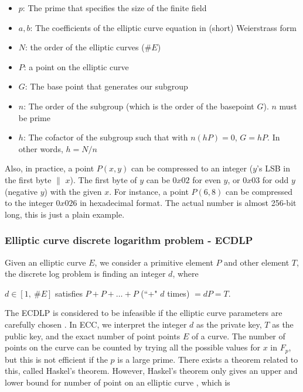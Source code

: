 \begin{itemize}
  \item$p$: The prime that specifies the size of the finite field
  \item$a, b$: The coefficients of the elliptic curve equation in (short) Weierstrass form
  \item$N$: the order of the elliptic curves ($\#E$)
  \item $P$: a point on the elliptic curve
        \item$G$: The base point that generates our subgroup
        \item$n$: The order of the subgroup (which is the order of the basepoint $G$). $n$ must be prime
        \item$h$: The cofactor of the subgroup such that with $n(hP)=0$, $G = hP$. In other words, $h=N/n$
\end{itemize}

Also, in practice, a point $P(x,y)$ can be compressed to an integer ($y$’s LSB in the first byte $\|$  $x$). The first byte of $y$ can be $0x02$ for even $y$, or $0x03$ for odd $y$ (negative $y$) with the given $x$. For instance, a point $P(6, 8)$ can be compressed to the integer $0x026$ in hexadecimal format. The actual number is almost 256-bit long, this is just a plain example.

\subsubsection{Elliptic curve discrete logarithm problem - ECDLP}

Given an elliptic curve $E$, we consider a primitive element $P$ and other element $T$, the discrete log problem is finding an integer $d$, where
\begin{center}

$d \in [1, \ \#E]$ satisfies $P + P + \dotso + P$ (``+" $d$ times) $= dP = T$.
\end{center}

The ECDLP is considered to be infeasible if the elliptic curve parameters are carefully chosen \cite{DBLP:journals/iacr/BosCLN14}. In ECC, we interpret the integer $d$ as the private key, $T$ as the public key, and the exact number of point points $E$ of a curve. The number of points on the curve can be counted by trying all the possible values for $x$ in $F_p$, but this is not efficient if the $p$ is a large prime. There exists a theorem related to this, called Haskel’s theorem. However, Haskel’s theorem only gives an upper and lower bound for number of point on an elliptic curve \cite{DBLP:journals/iacr/BosCLN14}, which is

